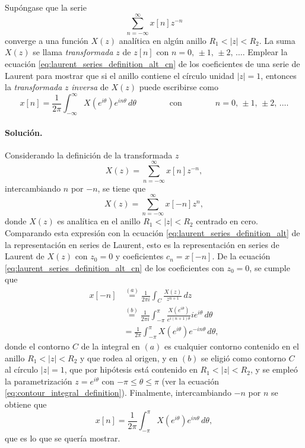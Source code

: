 \documentclass[a4paper]{report}
\begin{document}
Supóngase que la serie
\[
 \sum_{n=-\infty}^\infty x[n]z^{-n}
\]
converge a una función \(X(z)\) analítica en algún anillo \(R_1<|z|<R_2\). La suma \(X(z)\) se llama \emph{transformada} \(z\) de \(z[n]\) con \(n=0,\,\pm1,\,\pm2,\,\dots\). Emplear la ecuación \ref{eq:laurent_series_definition_alt_cn} de los coeficientes de una serie de Laurent para mostrar que si el anillo contiene el círculo unidad \(|z|=1\), entonces la \emph{transformada} \(z\) \emph{inversa} de \(X(z)\) puede escribirse como
\[
 x[n]=\frac{1}{2\pi}\int_{-\infty}^\infty X(e^{i\theta})e^{in\theta}\,d\theta
 \qquad\qquad\textrm{con}\qquad\qquad
 n=0,\,\pm1,\,\pm2,\,\dots.
\]

\paragraph{Solución.} Considerando la definición de la transformada \(z\)
\[
 X(z)=\sum_{n=-\infty}^\infty x[n]z^{-n},
\]
intercambiando \(n\) por \(-n\), se tiene que 
\[
 X(z)=\sum_{n=-\infty}^\infty x[-n]z^{n},
\]
donde \(X(z)\) es analítica en el anillo \(R_1<|z|<R_2\) centrado en cero. Comparando esta expresión con la ecuación \ref{eq:laurent_series_definition_alt} de la representación en series de Laurent, esto es la representación en series de Laurent de \(X(z)\) con \(z_0=0\) y coeficientes \(c_n=x[-n]\). De la ecuación \ref{eq:laurent_series_definition_alt_cn} de los coeficientes con \(z_0=0\), se cumple que 
\begin{align*}
 x[-n]&\overset{(a)}{=}\frac{1}{2\pi i}\int_C\frac{X(z)}{z^{n+1}}\,dz\\
   &\overset{(b)}{=}\frac{1}{2\pi i}\int_{-\pi}^\pi\frac{X(e^{i\theta})}{e^{i(n+1)\theta}}ie^{i\theta}\,d\theta\\
   &=\frac{1}{2\pi}\int_{-\pi}^\pi X(e^{i\theta})e^{-in\theta}\,d\theta,
\end{align*}
donde el contorno \(C\) de la integral en \((a)\) es cualquier contorno contenido en el anillo \(R_1<|z|<R_2\) y que rodea al origen, y en \((b)\) se eligió como contorno \(C\) al círculo \(|z|=1\), que por hipótesis está contenido en \(R_1<|z|<R_2\), y se empleó la parametrización \(z=e^{i\theta}\) con \(-\pi\leq\theta\leq\pi\) (ver la ecuación \ref{eq:contour_integral_definition}). Finalmente, intercambiando \(-n\) por \(n\) se obtiene que 
\[
 x[n]=\frac{1}{2\pi}\int_{-\pi}^\pi X(e^{i\theta})e^{in\theta}\,d\theta,
\]
que es lo que se quería mostrar.
\end{document}
